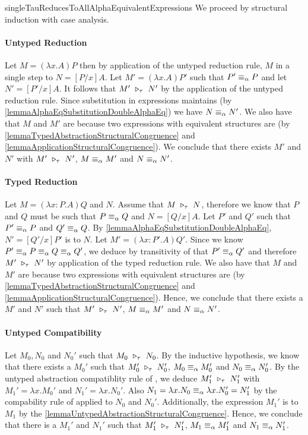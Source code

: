 %
%

\begin{longproof}{singleTauReducesToAllAlphaEquivalentExpressions}
We proceed by structural induction with case analysis.

\paragraph{Untyped Reduction}
Let $M=(\lambda x.A)P$ then by application of the untyped reduction rule, $M$ \taureduces in a single step to $N=[P/x]A$. Let $M'=(\lambda x.A)P'$ such that $P' \equiv_\alpha P$ and let $N'=[P'/x]A$. It follows that $M' \ \triangleright_{\tau}\  N'$ by the application of the untyped reduction rule. Since substitution in \alphaequivalent expressions maintains \alphaequivalence (by \cref{lemmaAlphaEqSubstitutionDoubleAlphaEq}) we have $N \equiv_\alpha N'$. We also have that $M$ and $M'$ are \alphaequivalent because two expressions with equivalent structures are \alphaequivalence (by \cref{lemmaTypedAbstractionStructuralCongruence} and \cref{lemmaApplicationStructuralCongruence}). We conclude that there exists $M'$ and $N'$ with $M' \ \triangleright_{\tau}\  N'$, $M \equiv_\alpha M'$ and $N \equiv_\alpha N'$.

\paragraph{Typed Reduction}
Let $M=(\lambda x:P.A)Q$ and $N$. Assume that $M \ \triangleright_{\tau}\  N$, therefore we know that $P$ and $Q$ must be such that $P \equiv_\alpha Q$ and $N=[Q/x]A$. Let $P'$ and $Q'$ such that $P' \equiv_\alpha P$ and $Q' \equiv_\alpha Q$. By \cref{lemmaAlphaEqSubstitutionDoubleAlphaEq}, $N'=[Q'/x]P'$ is \alphaequivalent to $N$. Let $M'=(\lambda x:P'.A)Q'$. Since we know $P' \equiv_\alpha P \equiv_\alpha Q \equiv_\alpha Q'$, we deduce by transitivity of \alphaequivalence that $P' \equiv_\alpha Q'$ and therefore $M' \ \triangleright_{\tau}\  N'$ by application of the typed reduction rule. We also have that $M$ and $M'$ are \alphaequivalent because two expressions with equivalent structures are \alphaequivalence (by \cref{lemmaTypedAbstractionStructuralCongruence} and \cref{lemmaApplicationStructuralCongruence}). Hence, we conclude that there exists a $M'$ and $N'$ such that $M' \ \triangleright_{\tau}\  N'$, $M \equiv_\alpha M'$ and $N \equiv_\alpha N'$.

\paragraph{Untyped Compatibility}
Let $M_0, N_0$ and $N_0'$ such that $M_0 \ \triangleright_{\tau}\  N_0$. By the inductive hypothesis, we know that there exists a $M_0'$ such that $M_0' \ \triangleright_{\tau}\  N_0'$, $M_0 \equiv_\alpha M_0'$ and $N_0 \equiv_\alpha N_0'$. By the untyped abstraction compatiblity rule of \taureduction, we deduce $M_1' \ \triangleright_{\tau}\  N_1'$ with $M_1'=\lambda x.M_0'$ and $N_1'=\lambda x.N_0'$. Also $N_1=\lambda x.N_0 \equiv_\alpha \lambda x.N_0'=N_1'$ by the compability rule of \alphaequivalence applied to $N_0$ and $N_0'$. Additionally, the expression $M_1'$ is \alphaequivalent to $M_1$ by the \cref{lemmaUntypedAbstractionStructuralCongruence}. Hence, we conclude that there is a $M_1'$ and $N_1'$ such that $M_1' \ \triangleright_{\tau}\  N_1'$, $M_1 \equiv_\alpha M_1'$ and $N_1 \equiv_\alpha N_1'$.


\end{longproof}

